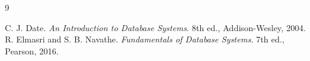 \begin{thebibliography}{9}
 C. J. Date. \emph{An Introduction to Database Systems}. 8th ed., Addison-Wesley, 2004.
 R. Elmasri and S. B. Navathe. \emph{Fundamentals of Database Systems}. 7th ed., Pearson, 2016.
\end{thebibliography}
